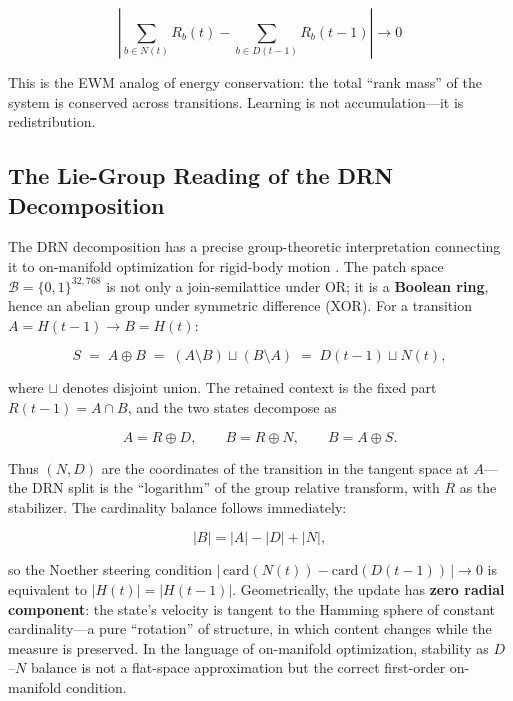 \documentclass[11pt,a4paper]{article}
\theoremstyle{remark}
\begin{document}
\begin{equation}
  \left|\sum_{b \in N(t)} R_b(t) - \sum_{b \in D(t-1)} R_b(t-1)\right| \to 0
\end{equation}

This is the EWM analog of energy conservation: the total ``rank mass'' of the system is
conserved across transitions. Learning is not accumulation---it is redistribution.

\subsection{The Lie-Group Reading of the DRN Decomposition}
\label{sec:lie-drn}

The DRN decomposition has a precise group-theoretic interpretation connecting
it to on-manifold optimization for rigid-body motion \cite{argueta2026}. The
patch space $\mathcal{B} = \{0,1\}^{32{,}768}$ is not only a join-semilattice
under OR; it is a \textbf{Boolean ring}, hence an abelian group under symmetric
difference (XOR). For a transition $A = H(t-1) \to B = H(t)$:

\begin{equation}
  S \;=\; A \oplus B \;=\; (A \setminus B) \sqcup (B \setminus A)
  \;=\; D(t-1) \sqcup N(t),
\end{equation}

where $\sqcup$ denotes disjoint union. The retained context is the fixed part
$R(t-1) = A \cap B$, and the two states decompose as

\begin{equation}
  A = R \oplus D, \qquad B = R \oplus N, \qquad B = A \oplus S.
\end{equation}

Thus $(N, D)$ are the coordinates of the transition in the tangent space at
$A$---the DRN split is the ``logarithm'' of the group relative transform, with
$R$ as the stabilizer. The cardinality balance follows immediately:

\begin{equation}
  |B| = |A| - |D| + |N|,
\end{equation}

so the Noether steering condition
$|\,\text{card}(N(t)) - \text{card}(D(t-1))\,| \to 0$ is equivalent to
$|H(t)| = |H(t-1)|$. Geometrically, the update has \textbf{zero radial
component}: the state's velocity is tangent to the Hamming sphere of constant
cardinality---a pure ``rotation'' of structure, in which content changes while
the measure is preserved. In the language of on-manifold optimization,
stability as $D$--$N$ balance is not a flat-space approximation but the correct
first-order on-manifold condition.
\end{document}
